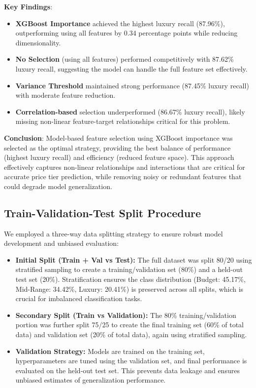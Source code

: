 \documentclass[12pt, a4paper]{article}
\begin{document}
\textbf{Key Findings}:
\begin{itemize}
  \item \textbf{XGBoost Importance} achieved the highest luxury recall (87.96\%), outperforming using all features by 0.34 percentage points while reducing dimensionality.
  \item \textbf{No Selection} (using all features) performed competitively with 87.62\% luxury recall, suggesting the model can handle the full feature set effectively.
  \item \textbf{Variance Threshold} maintained strong performance (87.45\% luxury recall) with moderate feature reduction.
  \item \textbf{Correlation-based} selection underperformed (86.67\% luxury recall), likely missing non-linear feature-target relationships critical for this problem.
\end{itemize}

\textbf{Conclusion}: Model-based feature selection using XGBoost importance was selected as the optimal strategy, providing the best balance of performance (highest luxury recall) and efficiency (reduced feature space). This approach effectively captures non-linear relationships and interactions that are critical for accurate price tier prediction, while removing noisy or redundant features that could degrade model generalization.


\subsection{Train-Validation-Test Split Procedure}
We employed a three-way data splitting strategy to ensure robust model development and unbiased evaluation:

\begin{itemize}
  \item \textbf{Initial Split (Train + Val vs Test):} The full dataset was split 80/20 using stratified sampling to create a training/validation set (80\%) and a held-out test set (20\%). Stratification ensures the class distribution (Budget: 45.17\%, Mid-Range: 34.42\%, Luxury: 20.41\%) is preserved across all splits, which is crucial for imbalanced classification tasks.
  
  \item \textbf{Secondary Split (Train vs Validation):} The 80\% training/validation portion was further split 75/25 to create the final training set (60\% of total data) and validation set (20\% of total data), again using stratified sampling.
  
  \item \textbf{Validation Strategy:} Models are trained on the training set, hyperparameters are tuned using the validation set, and final performance is evaluated on the held-out test set. This prevents data leakage and ensures unbiased estimates of generalization performance.
\end{itemize}
\end{document}
